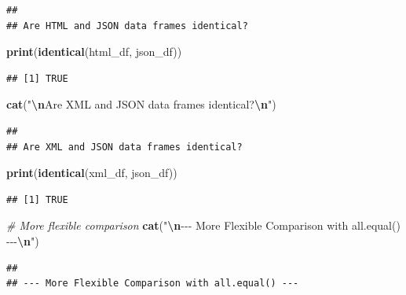 \documentclass[
]{article}
\newenvironment{Shaded}{\begin{snugshade}}{\end{snugshade}}
\newcommand{\CommentTok}[1]{\textcolor[rgb]{0.56,0.35,0.01}{\textit{#1}}}
\newcommand{\FunctionTok}[1]{\textcolor[rgb]{0.13,0.29,0.53}{\textbf{#1}}}
\newcommand{\NormalTok}[1]{#1}
\newcommand{\SpecialCharTok}[1]{\textcolor[rgb]{0.81,0.36,0.00}{\textbf{#1}}}
\newcommand{\StringTok}[1]{\textcolor[rgb]{0.31,0.60,0.02}{#1}}
\begin{document}
\begin{verbatim}
## 
## Are HTML and JSON data frames identical?
\end{verbatim}

\begin{Shaded}
\begin{Highlighting}[]
\FunctionTok{print}\NormalTok{(}\FunctionTok{identical}\NormalTok{(html\_df, json\_df))}
\end{Highlighting}
\end{Shaded}

\begin{verbatim}
## [1] TRUE
\end{verbatim}

\begin{Shaded}
\begin{Highlighting}[]
\FunctionTok{cat}\NormalTok{(}\StringTok{"}\SpecialCharTok{\textbackslash{}n}\StringTok{Are XML and JSON data frames identical?}\SpecialCharTok{\textbackslash{}n}\StringTok{"}\NormalTok{)}
\end{Highlighting}
\end{Shaded}

\begin{verbatim}
## 
## Are XML and JSON data frames identical?
\end{verbatim}

\begin{Shaded}
\begin{Highlighting}[]
\FunctionTok{print}\NormalTok{(}\FunctionTok{identical}\NormalTok{(xml\_df, json\_df))}
\end{Highlighting}
\end{Shaded}

\begin{verbatim}
## [1] TRUE
\end{verbatim}

\begin{Shaded}
\begin{Highlighting}[]
\CommentTok{\# More flexible comparison}
\FunctionTok{cat}\NormalTok{(}\StringTok{"}\SpecialCharTok{\textbackslash{}n}\StringTok{{-}{-}{-} More Flexible Comparison with all.equal() {-}{-}{-}}\SpecialCharTok{\textbackslash{}n}\StringTok{"}\NormalTok{)}
\end{Highlighting}
\end{Shaded}

\begin{verbatim}
## 
## --- More Flexible Comparison with all.equal() ---
\end{verbatim}
\end{document}
